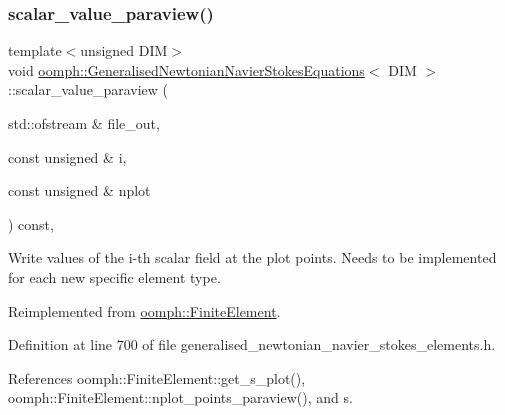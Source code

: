 \subsubsection{\texorpdfstring{scalar\+\_\+value\+\_\+paraview()}{scalar\_value\_paraview()}}
{\footnotesize\ttfamily template$<$unsigned D\+IM$>$ \\
void \hyperlink{classoomph_1_1GeneralisedNewtonianNavierStokesEquations}{oomph\+::\+Generalised\+Newtonian\+Navier\+Stokes\+Equations}$<$ D\+IM $>$\+::scalar\+\_\+value\+\_\+paraview (\begin{DoxyParamCaption}\item[{std\+::ofstream \&}]{file\+\_\+out,  }\item[{const unsigned \&}]{i,  }\item[{const unsigned \&}]{nplot }\end{DoxyParamCaption}) const\hspace{0.3cm}{\ttfamily [inline]}, {\ttfamily [virtual]}}



Write values of the i-\/th scalar field at the plot points. Needs to be implemented for each new specific element type. 



Reimplemented from \hyperlink{classoomph_1_1FiniteElement_a02cf8832a5e2886f1572bd36f7a7c1e3}{oomph\+::\+Finite\+Element}.



Definition at line 700 of file generalised\+\_\+newtonian\+\_\+navier\+\_\+stokes\+\_\+elements.\+h.



References oomph\+::\+Finite\+Element\+::get\+\_\+s\+\_\+plot(), oomph\+::\+Finite\+Element\+::nplot\+\_\+points\+\_\+paraview(), and s.

\mbox{\label{classoomph_1_1GeneralisedNewtonianNavierStokesEquations_ac04b91f61649005866f7108ad8f3ce19}} 

